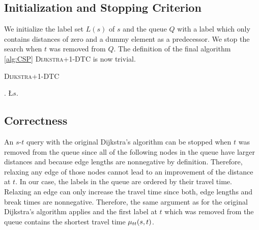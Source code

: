 \subsection{Initialization and Stopping Criterion}
We initialize the label set $L(s)$ of $s$ and the queue $Q$ with a label which only contains distances of zero and a dummy element as a predecessor. We stop the search when $t$ was removed from $Q$. The definition of the final algorithm \ref{alg:CSP} \textsc{Dijkstra+1-DTC} is now trivial.

\begin{algorithm}[bt]
	\caption{\textsc{Dijkstra+1-DTC}}\label{alg:CSP}

	\DontPrintSemicolon %



	\BlankLine
	\Q.\;
	\L{$s$}.\;
	\BlankLine
	{
		\settleNextNode{}\;

		{
			\Return\;
		}
	}
\end{algorithm}

\subsection{Correctness\label{sec:dijkstra_csp_correctness}}
An $s$-$t$ query with the original Dijkstra's algorithm can be stopped when $t$ was removed from the queue since all of the following nodes in the queue have larger distances and because edge lengths are nonnegative by definition. Therefore, relaxing any edge of those nodes cannot lead to an improvement of the distance at $t$.
In our case, the labels in the queue are ordered by their travel time. Relaxing an edge can only increase the travel time since both, edge lengths and break times are nonnegative. Therefore, the same argument as for the original Dijkstra's algorithm applies and the first label at $t$ which was removed from the queue contains the shortest travel time $\mu_{tt}(s,t)$.

